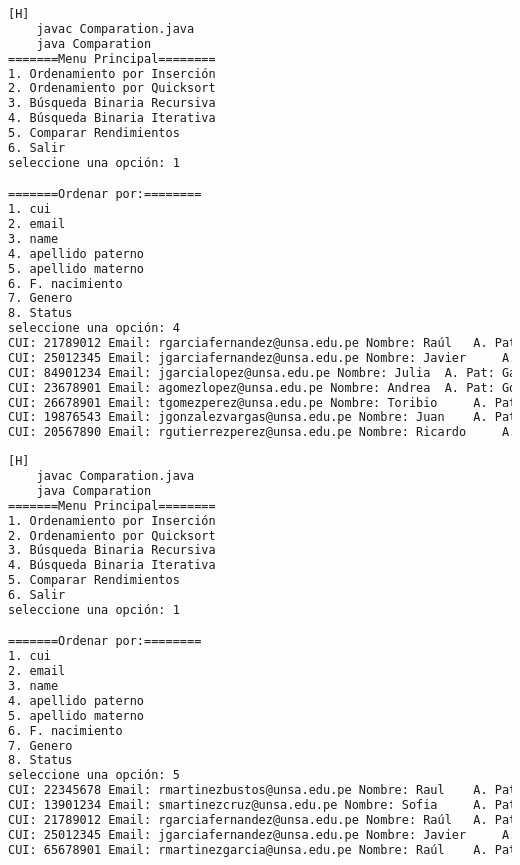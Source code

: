         \begin{lstlisting}[language=bash,caption={Compilación y ejecución del código}][H]
    javac Comparation.java
    java Comparation
=======Menu Principal========
1. Ordenamiento por Inserción
2. Ordenamiento por Quicksort
3. Búsqueda Binaria Recursiva
4. Búsqueda Binaria Iterativa
5. Comparar Rendimientos
6. Salir
seleccione una opción: 1

=======Ordenar por:========
1. cui
2. email
3. name
4. apellido paterno
5. apellido materno
6. F. nacimiento
7. Genero
8. Status
seleccione una opción: 4
CUI: 21789012 Email: rgarciafernandez@unsa.edu.pe Nombre: Raúl	 A. Pat: Garcia A. Mat: Fernandez Fecha de Nacimiento: 1992-07-22 Genero: 1 Estado: 1
CUI: 25012345 Email: jgarciafernandez@unsa.edu.pe Nombre: Javier	 A. Pat: Garcia A. Mat: Fernandez Fecha de Nacimiento: 1998-02-17 Genero: 1 Estado: 1
CUI: 84901234 Email: jgarcialopez@unsa.edu.pe Nombre: Julia	 A. Pat: Garcia A. Mat: Lopez Fecha de Nacimiento: 1993-04-19 Genero: 0 Estado: 1
CUI: 23678901 Email: agomezlopez@unsa.edu.pe Nombre: Andrea	 A. Pat: Gomez A. Mat: Lopez Fecha de Nacimiento: 1999-04-05 Genero: 0 Estado: 1
CUI: 26678901 Email: tgomezperez@unsa.edu.pe Nombre: Toribio	 A. Pat: Gomez A. Mat: Perez Fecha de Nacimiento: 1995-10-15 Genero: 1 Estado: 1
CUI: 19876543 Email: jgonzalezvargas@unsa.edu.pe Nombre: Juan	 A. Pat: Gonzalez A. Mat: Vargas Fecha de Nacimiento: 1995-09-20 Genero: 1 Estado: 1
CUI: 20567890 Email: rgutierrezperez@unsa.edu.pe Nombre: Ricardo	 A. Pat: Gutierrez A. Mat: Perez Fecha de Nacimiento: 2001-11-15 Genero: 1 Estado: 1

  \end{lstlisting}

        \begin{lstlisting}[language=bash,caption={Compilación y ejecución del código}][H]
    javac Comparation.java
    java Comparation
=======Menu Principal========
1. Ordenamiento por Inserción
2. Ordenamiento por Quicksort
3. Búsqueda Binaria Recursiva
4. Búsqueda Binaria Iterativa
5. Comparar Rendimientos
6. Salir
seleccione una opción: 1

=======Ordenar por:========
1. cui
2. email
3. name
4. apellido paterno
5. apellido materno
6. F. nacimiento
7. Genero
8. Status
seleccione una opción: 5
CUI: 22345678 Email: rmartinezbustos@unsa.edu.pe Nombre: Raul	 A. Pat: Martinez A. Mat: Bustos Fecha de Nacimiento: 1988-10-30 Genero: 1 Estado: 1
CUI: 13901234 Email: smartinezcruz@unsa.edu.pe Nombre: Sofia	 A. Pat: Martinez A. Mat: Cruz Fecha de Nacimiento: 1994-05-18 Genero: 0 Estado: 1
CUI: 21789012 Email: rgarciafernandez@unsa.edu.pe Nombre: Raúl	 A. Pat: Garcia A. Mat: Fernandez Fecha de Nacimiento: 1992-07-22 Genero: 1 Estado: 1
CUI: 25012345 Email: jgarciafernandez@unsa.edu.pe Nombre: Javier	 A. Pat: Garcia A. Mat: Fernandez Fecha de Nacimiento: 1998-02-17 Genero: 1 Estado: 1
CUI: 65678901 Email: rmartinezgarcia@unsa.edu.pe Nombre: Raúl	 A. Pat: Martinez A. Mat: Garcia Fecha de Nacimiento: 1991-06-20 Genero: 0 Estado: 1

  \end{lstlisting}

